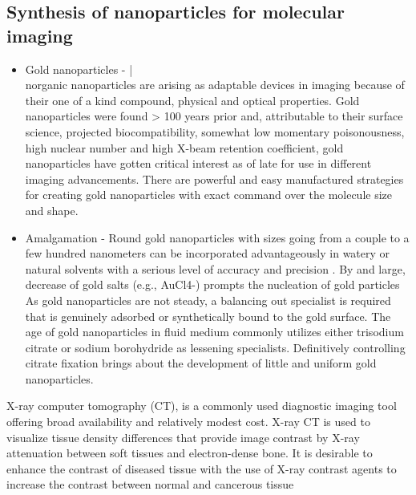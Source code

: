 \documentclass{article}
\begin{document}
\subsection*{ Synthesis of nanoparticles for molecular imaging}
\begin{itemize}
    \item Gold nanoparticles - |\\norganic nanoparticles are arising as adaptable devices in imaging because of their one of a kind compound, physical and optical properties. Gold nanoparticles were found > 100 years prior and, attributable to their surface science, projected biocompatibility, somewhat low momentary poisonousness, high nuclear number and high X-beam retention coefficient, gold nanoparticles have gotten critical interest as of late for use in different imaging advancements. There are powerful and easy manufactured strategies for creating gold nanoparticles with exact command over the molecule size and shape.\\ 
    \item Amalgamation - Round gold nanoparticles with sizes going from a couple to a few hundred nanometers can be incorporated advantageously in watery or natural solvents with a serious level of accuracy and precision . By and large, decrease of gold salts (e.g., AuCl4-) prompts the nucleation of gold particles As gold nanoparticles are not steady, a balancing out specialist is required that is genuinely adsorbed or synthetically bound to the gold surface. The age of gold nanoparticles in fluid medium commonly utilizes either trisodium citrate or sodium borohydride as lessening specialists. Definitively controlling citrate fixation brings about the development of little and uniform gold nanoparticles.
\end{itemize}
X-ray computer tomography (CT), is a commonly used diagnostic imaging tool offering broad availability and relatively modest cost. X-ray CT is used to visualize tissue density differences that provide image contrast by X-ray attenuation between soft tissues and electron-dense bone. It is desirable to enhance the contrast of diseased tissue with the use of X-ray contrast agents to increase the contrast between normal and cancerous tissue





 
 
\end{document}
